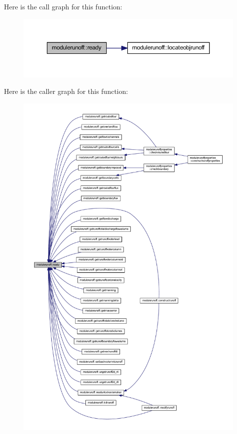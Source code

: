 Here is the call graph for this function\+:\nopagebreak
\begin{figure}[H]
\begin{center}
\leavevmode
\includegraphics[width=350pt]{namespacemodulerunoff_aee0c5b22d517afda2e934847c9da42cb_cgraph}
\end{center}
\end{figure}
Here is the caller graph for this function\+:\nopagebreak
\begin{figure}[H]
\begin{center}
\leavevmode
\includegraphics[width=350pt]{namespacemodulerunoff_aee0c5b22d517afda2e934847c9da42cb_icgraph}
\end{center}
\end{figure}
\mbox{\label{namespacemodulerunoff_a0a2296b090b1a35c74f3a4c0e35ad401}} 
